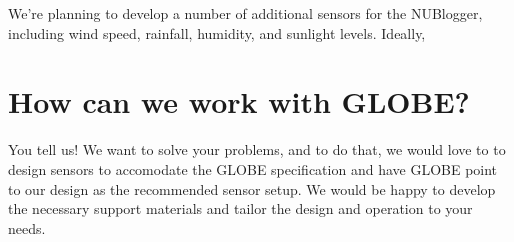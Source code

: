 \documentclass[12pt]{article}
\begin{document}
We're planning to develop a number of additional sensors for the NUBlogger, including  wind speed, rainfall, humidity, and sunlight levels.  Ideally,   


\section{How can we work with GLOBE?}
You tell us!  We want to solve your problems, and to do that, we would love to to design sensors to accomodate the GLOBE specification and have GLOBE point to our design as the recommended sensor setup.  We would be happy to develop the necessary support materials and tailor the design and operation to your needs.  
\end{document}
